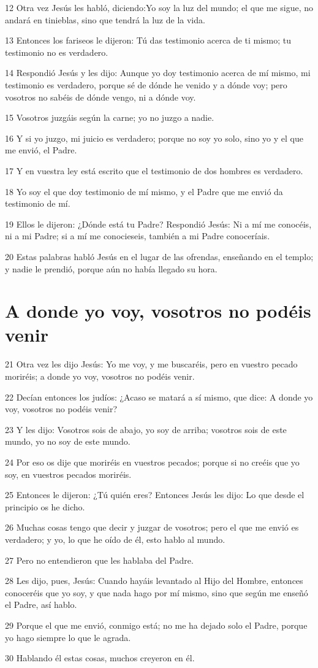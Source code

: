 \par 12 Otra vez Jesús les habló, diciendo:Yo soy la luz del mundo; el que me sigue, no andará en tinieblas, sino que tendrá la luz de la vida.
\par 13 Entonces los fariseos le dijeron: Tú das testimonio acerca de ti mismo; tu testimonio no es verdadero.
\par 14 Respondió Jesús y les dijo: Aunque yo doy testimonio acerca de mí mismo, mi testimonio es verdadero, porque sé de dónde he venido y a dónde voy; pero vosotros no sabéis de dónde vengo, ni a dónde voy.
\par 15 Vosotros juzgáis según la carne; yo no juzgo a nadie.
\par 16 Y si yo juzgo, mi juicio es verdadero; porque no soy yo solo, sino yo y el que me envió, el Padre.
\par 17 Y en vuestra ley está escrito que el testimonio de dos hombres es verdadero.
\par 18 Yo soy el que doy testimonio de mí mismo, y el Padre que me envió da testimonio de mí.
\par 19 Ellos le dijeron: ¿Dónde está tu Padre? Respondió Jesús: Ni a mí me conocéis, ni a mi Padre; si a mí me conocieseis, también a mi Padre conoceríais.
\par 20 Estas palabras habló Jesús en el lugar de las ofrendas, enseñando en el templo; y nadie le prendió, porque aún no había llegado su hora.

\section*{A donde yo voy, vosotros no podéis venir}

\par 21 Otra vez les dijo Jesús: Yo me voy, y me buscaréis, pero en vuestro pecado moriréis; a donde yo voy, vosotros no podéis venir.
\par 22 Decían entonces los judíos: ¿Acaso se matará a sí mismo, que dice: A donde yo voy, vosotros no podéis venir?
\par 23 Y les dijo: Vosotros sois de abajo, yo soy de arriba; vosotros sois de este mundo, yo no soy de este mundo.
\par 24 Por eso os dije que moriréis en vuestros pecados; porque si no creéis que yo soy, en vuestros pecados moriréis.
\par 25 Entonces le dijeron: ¿Tú quién eres? Entonces Jesús les dijo: Lo que desde el principio os he dicho.
\par 26 Muchas cosas tengo que decir y juzgar de vosotros; pero el que me envió es verdadero; y yo, lo que he oído de él, esto hablo al mundo.
\par 27 Pero no entendieron que les hablaba del Padre.
\par 28 Les dijo, pues, Jesús: Cuando hayáis levantado al Hijo del Hombre, entonces conoceréis que yo soy, y que nada hago por mí mismo, sino que según me enseñó el Padre, así hablo.
\par 29 Porque el que me envió, conmigo está; no me ha dejado solo el Padre, porque yo hago siempre lo que le agrada.
\par 30 Hablando él estas cosas, muchos creyeron en él.

